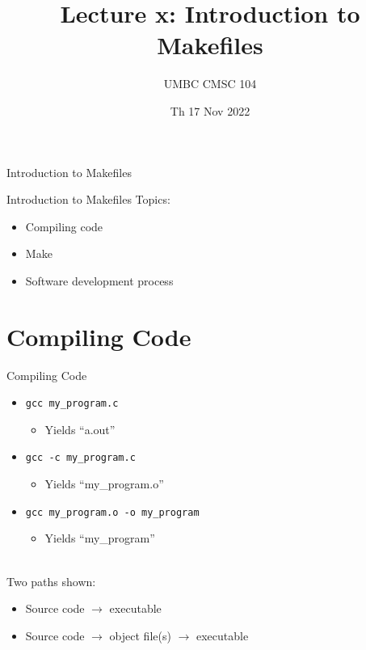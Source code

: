 \documentclass[graphics]{beamer}
\title{Lecture x: Introduction to Makefiles}
\author{UMBC CMSC 104}
\date{Th 17 Nov 2022}
\begin{document}
\begin{frame}{}
\centering
    Introduction to Makefiles
\end{frame}

\begin{frame}{Introduction to Makefiles}
    Topics:
    \begin{itemize}
        \item Compiling code
        \item Make
        \item Software development process
    \end{itemize}
\end{frame}

\section*{Compiling Code}
\begin{frame}{Compiling Code}
    \begin{itemize}
        \item \texttt{gcc my\_program.c}
        \begin{itemize}
            \item Yields ``a.out''
        \end{itemize}
        \item \texttt{gcc -c my\_program.c}
        \begin{itemize}
            \item Yields ``my\_program.o''
        \end{itemize}
        \item \texttt{gcc my\_program.o -o my\_program}
        \begin{itemize}
            \item Yields ``my\_program''
        \end{itemize}
    \end{itemize} ~~ \\
    Two paths shown:
    \begin{itemize}
        \item Source code $\rightarrow$ executable
        \item Source code $\rightarrow$ object file(s) $\rightarrow$ executable
    \end{itemize}
\end{frame}
\end{document}
